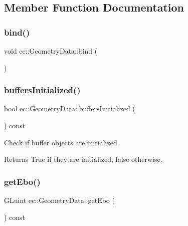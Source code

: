 \subsection{Member Function Documentation}
\mbox{\label{classec_1_1_geometry_data_acb50971e6fbd928172731a3427d22691}} 
\subsubsection{\texorpdfstring{bind()}{bind()}}
{\footnotesize\ttfamily void ec\+::\+Geometry\+Data\+::bind (\begin{DoxyParamCaption}{ }\end{DoxyParamCaption})}

\mbox{\label{classec_1_1_geometry_data_a23c0090061b5b21b74f070916915ca69}} 
\subsubsection{\texorpdfstring{buffers\+Initialized()}{buffersInitialized()}}
{\footnotesize\ttfamily bool ec\+::\+Geometry\+Data\+::buffers\+Initialized (\begin{DoxyParamCaption}{ }\end{DoxyParamCaption}) const}



Check if buffer objects are initialized. 

\begin{DoxyReturn}{Returns}
True if they are initialized, false otherwise. 
\end{DoxyReturn}
\mbox{\label{classec_1_1_geometry_data_ae3f427f933c595b169bd10551d52abc3}} 
\subsubsection{\texorpdfstring{get\+Ebo()}{getEbo()}}
{\footnotesize\ttfamily G\+Luint ec\+::\+Geometry\+Data\+::get\+Ebo (\begin{DoxyParamCaption}{ }\end{DoxyParamCaption}) const}



